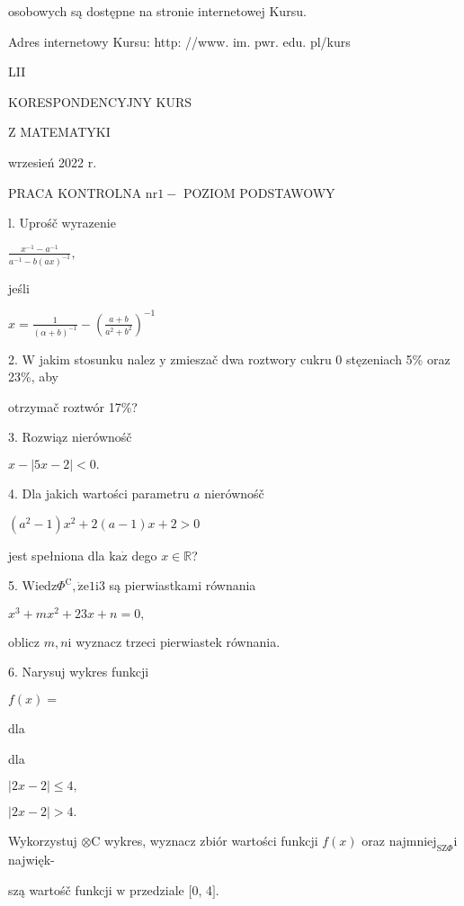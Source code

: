 \documentclass[a4paper,12pt]{article}
\begin{document}
osobowych są dostępne na stronie internetowej Kursu.

Adres internetowy Kursu: http: //www. im. pwr. edu. pl/kurs







LII

KORESPONDENCYJNY KURS

Z MATEMATYKI

wrzesień 2022 r.

PRACA KONTROLNA $\mathrm{n}\mathrm{r} 1-$ POZIOM PODSTAWOWY

l. Uprośč wyrazenie

$\displaystyle \frac{x^{-1}-a^{-1}}{a^{-1}-b(ax)^{-1}},$

jeśli

$x=\displaystyle \frac{1}{(\alpha+b)^{-1}}- (\displaystyle \frac{a+b}{a^{2}+b^{2}})^{-1}$

2. $\mathrm{W}$ jakim stosunku nalez $\mathrm{y}$ zmieszač dwa roztwory cukru $0$ stęzeniach 5\% oraz 23\%, aby

otrzymač roztwór 17\%?

3. Rozwiąz nierównośč

$x-|5x-2|<0.$

4. Dla jakich wartości parametru $a$ nierównośč

$(a^{2}-1)x^{2}+2(a-1)x+2>0$

jest spełniona dla $\mathrm{k}\mathrm{a}\dot{\mathrm{z}}$ dego $x\in \mathbb{R}$?

5. $\mathrm{W}\mathrm{i}\mathrm{e}\mathrm{d}\mathrm{z}\Phi^{\mathrm{C}}, \dot{\mathrm{z}}\mathrm{e}1\mathrm{i}3$ są pierwiastkami równania

$x^{3}+mx^{2}+23x+n=0,$

oblicz $m, n\mathrm{i}$ wyznacz trzeci pierwiastek równania.

6. Narysuj wykres funkcji

$f(x)=$

dla

dla

$|2x-2|\leq 4,$

$|2x-2|>4.$

Wykorzystuj $\otimes \mathrm{C}$ wykres, wyznacz zbiór wartości funkcji $f(x)$ oraz $\mathrm{n}\mathrm{a}\mathrm{j}\mathrm{m}\mathrm{n}\mathrm{i}\mathrm{e}\mathrm{j}_{\mathrm{S}\mathrm{Z}\Phi}\mathrm{i}$ najwięk-

szą wartośč funkcji $\mathrm{w}$ przedziale $[0$, 4$].$
\end{document}
